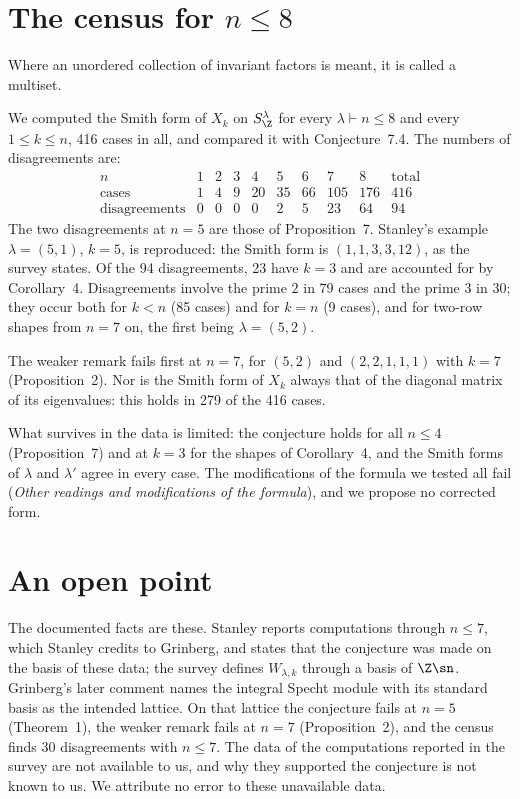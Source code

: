
\section{The census for \texorpdfstring{$n\le8$}{n <= 8}}\label{sec:census}
Where an unordered collection of invariant factors is meant, it is called a multiset.

We computed the Smith form of $X_k$ on $S^\lambda_\Z$ for every
$\lambda\vdash n\le8$ and every $1\le k\le n$, 416 cases in all, and compared
it with Conjecture~7.4. The numbers of disagreements are:
\[
\begin{array}{l|cccccccc|c}
n & 1&2&3&4&5&6&7&8&\text{total}\\\hline
\text{cases} & 1&4&9&20&35&66&105&176&416\\
\text{disagreements} & 0&0&0&0&2&5&23&64&94
\end{array}
\]
The two disagreements at $n=5$ are those of Proposition~7.
Stanley's example $\lambda=(5,1)$, $k=5$, is reproduced: the Smith form is
$(1,1,3,3,12)$, as the survey states. Of the 94 disagreements, 23 have $k=3$
and are accounted for by Corollary~4. Disagreements involve the
prime $2$ in 79 cases and the prime $3$ in 30; they occur both for $k<n$ (85
cases) and for $k=n$ (9 cases), and for two-row shapes from $n=7$ on, the
first being $\lambda=(5,2)$.

The weaker remark fails first at $n=7$, for $(5,2)$ and $(2,2,1,1,1)$ with
$k=7$ (Proposition~2). Nor is the Smith form of $X_k$ always that
of the diagonal matrix of its eigenvalues: this holds in 279 of the 416
cases.

What survives in the data is limited: the conjecture holds for all
$n\le4$ (Proposition~7) and at $k=3$ for the shapes of
Corollary~4, and the Smith forms of $\lambda$ and $\lambda'$ agree
in every case. The modifications of the formula we tested all fail
(\emph{Other readings and modifications of the formula}), and we propose no corrected form.

\section{An open point}\label{sec:open}

The documented facts are these. Stanley reports computations through
$n\le7$, which Stanley credits to Grinberg, and states that the conjecture was
made on the basis of these data; the survey defines $W_{\lambda,k}$ through a
basis of $\Z\sn$. Grinberg's later comment names the integral Specht module with its standard basis as the
intended lattice. On that lattice the conjecture fails at $n=5$
(Theorem~1), the weaker remark fails at $n=7$
(Proposition~2), and the census finds 30 disagreements with
$n\le7$. The data of
the computations reported in the survey are not available to us, and why
they supported the conjecture is not known to us. We attribute no error to these unavailable data.


